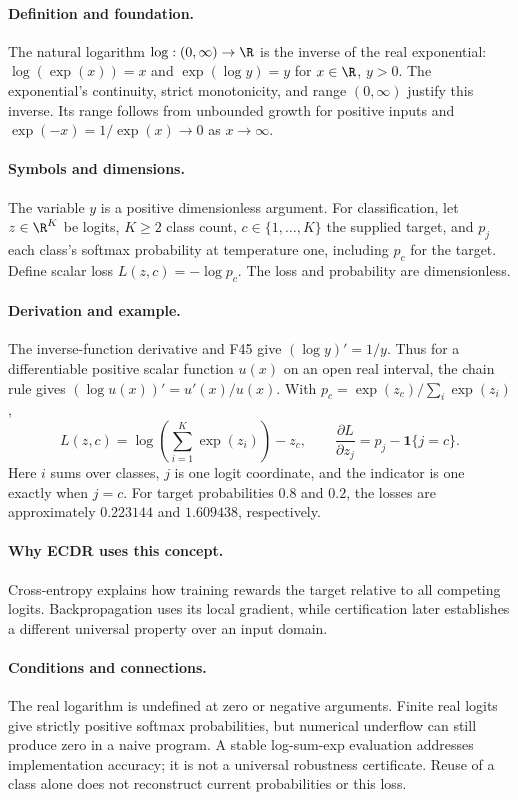 \paragraph{Definition and foundation.}
The natural logarithm $\log:(0,\infty)\to\R$ is the inverse of the real exponential: $\log(\exp(x))=x$ and $\exp(\log y)=y$ for $x\in\R$, $y>0$. The exponential's continuity, strict monotonicity, and range $(0,\infty)$ justify this inverse. Its range follows from unbounded growth for positive inputs and $\exp(-x)=1/\exp(x)\to0$ as $x\to\infty$.
\paragraph{Symbols and dimensions.}
The variable $y$ is a positive dimensionless argument. For classification, let $z\in\R^K$ be logits, $K\ge2$ class count, $c\in\{1,\ldots,K\}$ the supplied target, and $p_j$ each class's softmax probability at temperature one, including $p_c$ for the target. Define scalar loss $L(z,c)=-\log p_c$. The loss and probability are dimensionless.
\paragraph{Derivation and example.}
The inverse-function derivative and F45 give $(\log y)'=1/y$. Thus for a differentiable positive scalar function $u(x)$ on an open real interval, the chain rule gives $(\log u(x))'=u'(x)/u(x)$. With $p_c=\exp(z_c)/\sum_i\exp(z_i)$,
\[
 L(z,c)=\log\!\left(\sum_{i=1}^{K}\exp(z_i)\right)-z_c,
 \qquad
 \frac{\partial L}{\partial z_j}=p_j-\mathbf1\{j=c\}.
\]
Here $i$ sums over classes, $j$ is one logit coordinate, and the indicator is one exactly when $j=c$. For target probabilities $0.8$ and $0.2$, the losses are approximately $0.223144$ and $1.609438$, respectively.
\paragraph{Why ECDR uses this concept.}
Cross-entropy explains how training rewards the target relative to all competing logits. Backpropagation uses its local gradient, while certification later establishes a different universal property over an input domain.
\paragraph{Conditions and connections.}
The real logarithm is undefined at zero or negative arguments. Finite real logits give strictly positive softmax probabilities, but numerical underflow can still produce zero in a naive program. A stable log-sum-exp evaluation addresses implementation accuracy; it is not a universal robustness certificate. Reuse of a class alone does not reconstruct current probabilities or this loss.
